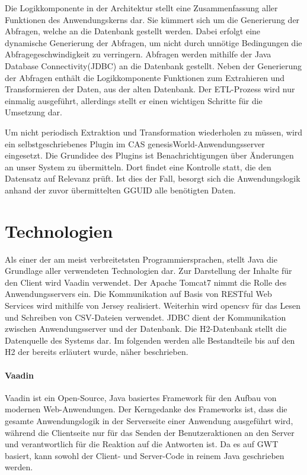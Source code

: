Die Logikkomponente in der Architektur stellt eine Zusammenfassung aller Funktionen des Anwendungskerns dar. Sie kümmert sich um die Generierung der Abfragen, welche an die Datenbank gestellt werden. Dabei erfolgt eine dynamische Generierung der Abfragen, um nicht durch unnötige Bedingungen die Abfragegeschwindigkeit zu verringern. Abfragen werden mithilfe der Java Database Connectivity(JDBC) an die Datenbank gestellt. Neben der Generierung der Abfragen enthält die Logikkomponente Funktionen zum Extrahieren und Transformieren der Daten, aus der alten Datenbank. Der ETL-Prozess wird nur einmalig ausgeführt, allerdings stellt er einen wichtigen  Schritte für die Umsetzung dar. 

Um nicht periodisch Extraktion und Transformation wiederholen zu müssen, wird ein selbstgeschriebenes Plugin im CAS genesisWorld-Anwendungsserver eingesetzt. Die Grundidee des Plugins ist Benachrichtigungen über Änderungen an unser System zu übermitteln. Dort findet eine Kontrolle statt, die den Datensatz auf Relevanz prüft. Ist dies der Fall, besorgt sich die Anwendungslogik anhand der zuvor übermittelten GGUID alle benötigten Daten.

\section{Technologien}

Als einer der am meist verbreitetsten Programmiersprachen, stellt Java die Grundlage aller verwendeten Technologien dar. Zur Darstellung der Inhalte für den Client wird Vaadin verwendet. Der Apache Tomcat7 nimmt die Rolle des Anwendungsservers ein. Die Kommunikation auf Basis von RESTful Web Services wird mithilfe von Jersey realisiert. Weiterhin wird opencsv für das Lesen und Schreiben von CSV-Dateien verwendet. JDBC dient der Kommunikation zwischen Anwendungsserver und der Datenbank. Die H2-Datenbank stellt die Datenquelle des Systems dar. Im folgenden werden alle Bestandteile bis auf den H2 der bereits erläutert wurde, näher beschrieben. 

\paragraph{Vaadin}

Vaadin ist ein Open-Source, Java basiertes Framework für den Aufbau von modernen Web-Anwendungen. Der Kerngedanke des Frameworks ist, dass die gesamte Anwendungslogik in der Serverseite einer Anwendung ausgeführt wird, während die Clientseite nur für das Senden der Benutzeraktionen an den Server und verantwortlich für die Reaktion auf die Antworten ist. Da es auf GWT basiert, kann sowohl der Client- und Server-Code in reinem Java geschrieben werden.

